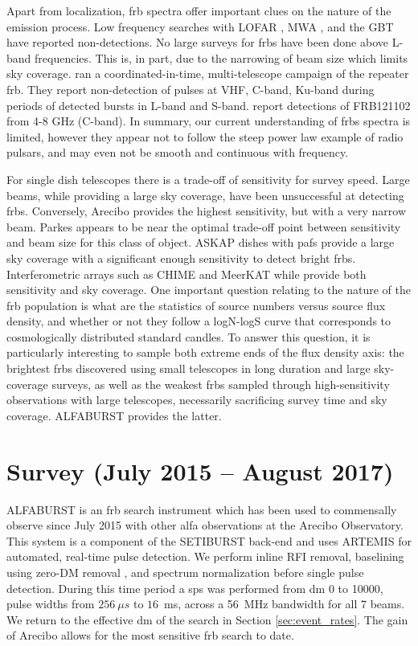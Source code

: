 \documentclass[a4paper,fleqn,usenatbib]{mnras}
\begin{document}
Apart from localization, \gls{frb} spectra offer important clues on
the nature of the emission process. Low frequency searches with LOFAR
\citep{2015MNRAS.452.1254K}, MWA \citep{2015AJ....150..199T}, and the
GBT \citep{2017arXiv170107457C} have reported non-detections.  No
large surveys for \glspl{frb} have been done above L-band
frequencies. This is, in part, due to the narrowing of beam size which
limits sky coverage.  \cite{2017arXiv170507553L} ran a
coordinated-in-time, multi-telescope campaign of the repeater
\gls{frb}.  They report non-detection of pulses at VHF, C-band,
Ku-band during periods of detected bursts in L-band and
S-band. \cite{atel10675} report detections of FRB121102 from 4-8 GHz
(C-band). In summary, our current understanding of \glspl{frb} spectra
is limited, however they appear not to follow the steep power law
example of radio pulsars, and may even not be smooth and continuous
with frequency.

For single dish telescopes there is a trade-off of sensitivity for
survey speed.  Large beams, while providing a large sky coverage, have
been unsuccessful at detecting \glspl{frb}. Conversely, Arecibo
provides the highest sensitivity, but with a very narrow beam. Parkes
appears to be near the optimal trade-off point between sensitivity and
beam size for this class of object. ASKAP dishes with \glspl{paf}
provide a large sky coverage with a significant enough sensitivity to
detect bright \glspl{frb}. Interferometric arrays such as CHIME and
MeerKAT while provide both sensitivity and sky coverage. One important
question relating to the nature of the \gls{frb} population is what
are the statistics of source numbers versus source flux density, and
whether or not they follow a logN-logS curve that corresponds to
cosmologically distributed standard candles. To answer this question,
it is particularly interesting to sample both extreme ends of the flux
density axis: the brightest \glspl{frb} discovered using small
telescopes in long duration and large sky-coverage surveys, as well as
the weakest \glspl{frb} sampled through high-sensitivity observations
with large telescopes, necessarily sacrificing survey time and sky
coverage. ALFABURST provides the latter.

\section{Survey (July 2015 -- August 2017)}
\label{sec:overview}

ALFABURST is an \gls{frb} search instrument which has been used to commensally
observe since July 2015 with other \gls{alfa} observations at the Arecibo
Observatory. This system is a component of the SETIBURST back-end
\citep{2017ApJS..228...21C} and uses ARTEMIS \citep{2015MNRAS.452.1254K} for
automated, real-time pulse detection. We perform inline RFI removal, baselining
using zero-DM removal \citep{2009MNRAS.395..410E}, and spectrum normalization
before single pulse detection. During this time period a \gls{sps} was
performed from \gls{dm} 0 to 10000, pulse widths from $256~\mu s$ to $16$~ms,
across a 56~MHz bandwidth for all 7 beams. We return to the effective \gls{dm}
of the search in Section \ref{sec:event_rates}. The gain of Arecibo allows for
the most sensitive \gls{frb} search to date.
\end{document}
